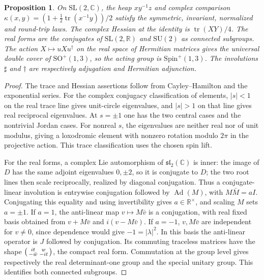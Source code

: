 \documentclass[11pt,reqno]{amsart}
\newtheorem{proposition}[theorem]{Proposition}
\theoremstyle{definition}
\theoremstyle{remark}
\numberwithin{equation}{section}
\newcommand{\R}{\mathbb{R}}
\newcommand{\C}{\mathbb{C}}
\begin{document}
\begin{proposition}\label{m3:spin}
On \(\mathrm{SL}(2,\C)\), the heap \(xy^{-1}z\) and complex
comparison \(\kappa(x,y)=(1+\tfrac12\operatorname{tr}(x^{-1}y))/2\)
satisfy the symmetric, invariant, normalized and round-trip laws.
The complex Hessian at the identity is
\(\operatorname{tr}(XY)/4\).
The real forms are the conjugates of \(\mathrm{SL}(2,\R)\) and
\(\mathrm{SU}(2)\) as connected subgroups. The action
\(X\mapsto uXu^\dagger\) on the real space of Hermitian matrices gives the
universal double cover of \(\mathrm{SO}^+(1,3)\), so the acting group is
\(\mathrm{Spin}^+(1,3)\). The involutions \(\sharp\) and \(\dagger\)
are respectively adjugation and Hermitian adjunction.
\end{proposition}
\begin{proof}
The trace and Hessian assertions follow from Cayley--Hamilton and the
exponential series. For the complex conjugacy classification of elements,
\(|s|<1\) on the real trace line gives unit-circle eigenvalues, and
\(|s|>1\) on that line gives real reciprocal eigenvalues. At \(s=\pm1\)
one has the two central cases and the nontrivial Jordan cases.
For nonreal \(s\), the eigenvalues are neither real nor of unit modulus,
giving a loxodromic element with nonzero rotation modulo \(2\pi\) in the
projective action. This trace classification uses the chosen spin lift.

For the real forms, a complex Lie automorphism of
\(\mathfrak{sl}_2(\C)\) is inner: the image of \(D\) has the same
adjoint eigenvalues \(0,\pm2\), so it is conjugate to \(D\); the two
root lines then scale reciprocally, realized by diagonal conjugation.
Thus a conjugate-linear involution is entrywise conjugation followed by
\(\operatorname{Ad}(M)\), with \(M\bar M=aI\). Conjugating this equality
and using invertibility gives \(a\in\R^\times\), and scaling \(M\)
sets \(a=\pm1\). If \(a=1\), the anti-linear map \(v\mapsto M\bar v\)
is a conjugation, with real fixed basis obtained from \(v+M\bar v\)
and \(i(v-M\bar v)\). If \(a=-1\), \(v,M\bar v\) are independent for
\(v\ne0\), since dependence would give \(-1=|\lambda|^2\). In this
basis the anti-linear operator is \(J\) followed by conjugation.
Its commuting traceless matrices have the shape
\(\begin{psmallmatrix} it&w\\-\bar w&-it\end{psmallmatrix}\),
the compact real form. Commutation at the group level gives
respectively the real determinant-one group and the special unitary
group. This identifies both connected subgroups.


\end{proof}
\end{document}

